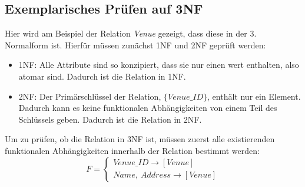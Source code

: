 \documentclass[12pt, oneside, a4paper]{article}
\newcommand{\set}[1]{\{#1\}} %
\begin{document}
\subsection{Exemplarisches Prüfen auf 3NF}





Hier wird am Beispiel der Relation \textit{Venue} gezeigt, dass diese in der 3. Normalform ist.
Hierfür müssen zunächst 1NF und 2NF geprüft werden:
\begin{itemize}
	\item 1NF: Alle Attribute sind so konzipiert, dass sie nur einen wert enthalten, also atomar sind. Dadurch ist die Relation in 1NF.
	\item 2NF: Der Primärschlüssel der Relation, $\set{Venue\_ID}$, enthält nur ein Element. Dadurch kann es keine funktionalen Abhängigkeiten von einem Teil des Schlüssels geben. Dadurch ist die Relation in 2NF.
\end{itemize}

Um zu prüfen, ob die Relation in 3NF ist, müssen zuerst alle existierenden funktionalen Abhängigkeiten innerhalb der Relation bestimmt werden:
$$F = \begin{cases}Venue\_ID \rightarrow [Venue] \\ Name,\ Address \rightarrow [Venue]\end{cases}$$
\end{document}

